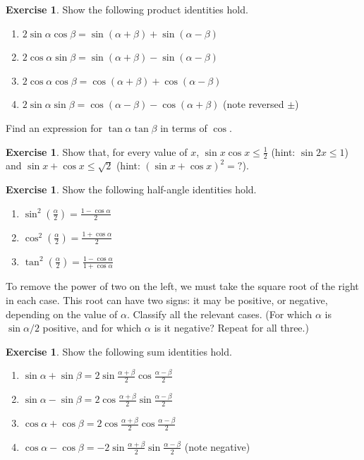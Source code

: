 \documentclass[a4paper,leqno]{article}
\newcommand{\marginsymbol}{\marginpar{\hfill(\ding{43})}}
\numberwithin{equation}{section}
\theoremstyle{definition}
\newtheorem{exercise}[equation]{Exercise}
\theoremstyle{remark}
\begin{document}
\begin{exercise}
  Show the following product identities hold.\marginsymbol
  \begin{enumerate}
    \item $ 2 \sin \alpha \cos \beta = \sin(\alpha + \beta) + \sin(\alpha - \beta) $
    \item $ 2 \cos \alpha \sin \beta = \sin(\alpha + \beta) - \sin(\alpha - \beta) $
    \item $ 2 \cos \alpha \cos \beta = \cos(\alpha + \beta) + \cos(\alpha - \beta) $
    \item $ 2 \sin \alpha \sin \beta = \cos(\alpha - \beta) - \cos(\alpha + \beta) $ (note reversed $ \pm $)
  \end{enumerate}
  Find an expression for $ \tan \alpha \tan \beta $ in terms of $ \cos $.
\end{exercise}

\begin{exercise}
  Show that, for every value of $ x $, $ \sin x \cos x \leq \frac{1}{2} $ (hint: $ \sin 2x \leq 1 $) and $ \sin x + \cos x \leq \sqrt{2} $
  (hint: $ (\sin x + \cos x)^2 = \textbf{?} $).
\end{exercise}

\begin{exercise}
  Show the following half-angle identities hold.
  \begin{enumerate}
    \item $ \sin^2 \left(\frac{\alpha}{2}\right) = \frac{1 - \cos \alpha}{2} $
    \item $ \cos^2 \left(\frac{\alpha}{2}\right) = \frac{1 + \cos \alpha}{2} $
    \item $ \tan^2 \left(\frac{\alpha}{2}\right) = \frac{1 - \cos \alpha}{1 + \cos \alpha} $
  \end{enumerate}
  To remove the power of two on the left, we must take the square root of the right in each case. This root
  can have two signs: it may be positive, or negative, depending on the value of $ \alpha $. Classify all the
  relevant cases. (For which $ \alpha $ is $ \sin \alpha/2 $ positive, and for which $ \alpha $ is it negative? Repeat for all three.)
\end{exercise}

\begin{exercise}
  Show the following sum identities hold.\marginsymbol
  \begin{enumerate}
    \item $ \sin \alpha + \sin \beta = 2\sin \frac{\alpha + \beta}{2} \cos \frac{\alpha - \beta}{2} $
    \item $ \sin \alpha - \sin \beta = 2\cos \frac{\alpha + \beta}{2} \sin \frac{\alpha - \beta}{2} $
    \item $ \cos \alpha + \cos \beta = 2\cos \frac{\alpha + \beta}{2} \cos \frac{\alpha - \beta}{2} $
    \item $ \cos \alpha - \cos \beta = -2\sin \frac{\alpha + \beta}{2} \sin \frac{\alpha - \beta}{2} $ (note negative)
  \end{enumerate}
\end{exercise}
\end{document}
